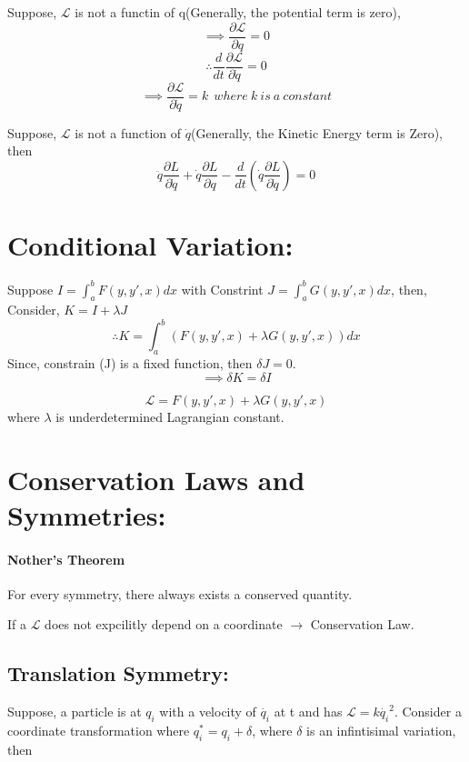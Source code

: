 \documentclass[a4paper]{article}
\newcommand{\Lagr}{\mathcal{L}}
\newcommand{\ddt}{\frac{d}{dt}}
\newcommand{\pdt}[2]{\frac{\partial #1}{\partial #2}}
\begin{document}
		Suppose, $\Lagr$ is not a functin of q(Generally, the potential term is zero), 
		$$\implies \frac{\partial\Lagr}{\partial q} = 0 $$
		$$\therefore \ddt\frac{\partial\Lagr}{\partial \dot{q}} = 0 $$
		$$\implies \frac{\partial\Lagr}{\partial \dot{q}} = k\ \ where\ k\ is\ a\ constant$$ 

		Suppose, $\Lagr$ is not a function of $\dot{q}$(Generally, the Kinetic Energy term is Zero), then
		$$ \ddot{q}\pdt{L}{\dot{q}} + \dot{q}\pdt{L}{q} - \ddt(\dot{q}\pdt{L}{\dot{q}}) = 0$$

	\section*{Conditional Variation: }
		
		\noindent

		Suppose $ I = \int_a^b F(y, y', x) dx $ with Constrint $ J = \int_a^b G(y, y', x) dx $, then, \hfill \\

		Consider, $ K = I + \lambda J $
		$$\therefore K = \int_a^b (F(y, y', x) + \lambda G(y, y', x)) dx $$
		Since, constrain (J) is a fixed function, then $\delta J =0 $.
		$$\implies \delta K = \delta I $$

		$$ \Lagr = F(y, y', x) + \lambda G(y, y', x) $$ where $\lambda$ is underdetermined Lagrangian constant.

	\section*{Conservation Laws and Symmetries: }

		\noindent

		\paragraph*{Nother's Theorem}
			For every symmetry, there always exists a conserved quantity.
		
		If a $\Lagr$ does not expcilitly depend on a coordinate $\rightarrow$ Conservation Law.

		\subsection*{Translation Symmetry: }

			\noindent

			Suppose, a particle is at $q_i$ with a velocity of $\dot{q_i}$ at t and has $\Lagr = k\dot{q_i}^2$.
			Consider a coordinate transformation where $q_i^* = q_i + \delta$, where $\delta$ is an infintisimal variation, then
			
\end{document}

